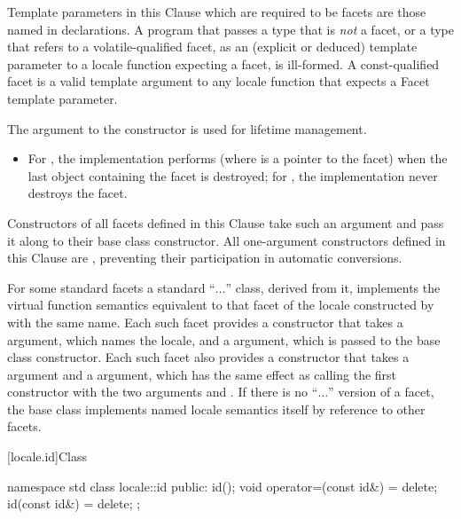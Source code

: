 \pnum
Template parameters in this Clause which are required to be facets are those named
in declarations.
A program that passes a type that is
\textit{not}
a facet, or a type that refers to a volatile-qualified facet, as an
(explicit or deduced) template parameter to a locale
function expecting a facet, is ill-formed. A const-qualified facet is a
valid template argument to any locale function that expects a Facet template
parameter.

\pnum
The 
argument to the constructor is used for lifetime management.

\begin{itemize}
\item
For
,
the implementation performs
(where
is a point\-er to the facet) when the last
object containing the facet is destroyed;
for
,
the implementation never destroys the facet.
\end{itemize}

\pnum
Constructors of all
facets defined in this Clause take such an argument and pass it
along to their
base class constructor.
All one-argument constructors defined
in this Clause are
,
preventing their participation in automatic conversions.

\pnum
For some standard facets a standard
``$\ldots$''
class, derived from it, implements the virtual function semantics
equivalent to that facet of the locale constructed by
with the same name.
Each such facet provides a constructor that takes a
argument, which names the locale, and a 
argument, which is passed to the base class constructor.
Each such facet also provides a constructor that takes a
 argument  and a 
argument, which has the same effect as calling the first constructor with the
two arguments  and .
If there is no
``$\ldots$''
version of a facet, the base class implements named locale
semantics itself by reference to other facets.

[locale.id]{Class }

%
\begin{codeblock}
namespace std {
  class locale::id {
  public:
    id();
    void operator=(const id&) = delete;
    id(const id&) = delete;
  };
}
\end{codeblock}

